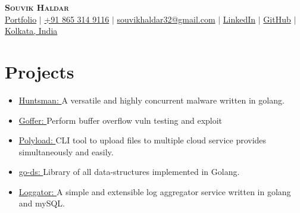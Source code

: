 \documentclass[letterpaper,11pt]{article}
\newcommand{\resumeItem}[1]{
  \item\small{
    {#1 \vspace{-2pt}}
  }
}
\newcommand{\resumeSubHeadingListStart}{\begin{itemize}[leftmargin=0.15in, label={}]}
\newcommand{\resumeSubHeadingListEnd}{\end{itemize}}
\newcommand{\resumeItemListStart}{\begin{itemize}}
\newcommand{\resumeItemListEnd}{\end{itemize}\vspace{-5pt}}
\begin{document}

\begin{center}
    \textbf{\Huge \scshape Souvik Haldar} \\ \vspace{3pt}
    \small
    \faGlobe \hspace{.5pt} \href{http://www.souvikhaldar.in}{Portfolio}
    $|$
    \faMobile \hspace{.5pt} \href{tel:918653149116}{+91 865 314 9116}
    $|$
    \faAt \hspace{.5pt} \href{mailto:souvikhaldar32@gmail.com}{souvikhaldar32@gmail.com}
    $|$
    \faLinkedinSquare \hspace{.5pt} \href{https://www.linkedin.com/in/souvikhaldar/}{LinkedIn}
    $|$
    \faGithub \hspace{.5pt} \href{https://github.com/souvikhaldar}{GitHub}
    $|$
    \faMapMarker \hspace{.5pt} \href{https://www.google.com/maps/place/Kolkata,+West+Bengal/@22.5354122,88.277313,12z/data=!3m1!4b1!4m5!3m4!1s0x39f882db4908f667:0x43e330e68f6c2cbc!8m2!3d22.572646!4d88.363895}{Kolkata, India}
\end{center}



\section{Projects}
    \vspace{3pt}
    \resumeSubHeadingListStart
      \small{\item{
	\resumeItemListStart
       		\resumeItem{\href{github.com/souvikhaldar/huntsman}{\color{blue}Huntsman: }{A versatile and highly concurrent malware written in golang.} \\ \vspace{3pt}} 
       		\resumeItem{\href{github.com/souvikhaldar/goffer}{\color{blue}Goffer: }{Perform buffer overflow vuln testing and exploit} \\ \vspace{3pt}} 
       		\resumeItem{\href{github.com/souvikhaldar/polyload}{\color{blue}Polyload: }{CLI tool to upload files to multiple cloud service provides simultaneously and easily.} \\ \vspace{3pt}} 
       		\resumeItem{\href{github.com/souvikhaldar/go-ds}{\color{blue}go-ds: }{Library of all data-structures implemented in Golang.} \\ \vspace{3pt}} 
       		\resumeItem{\href{https://github.com/souvikhaldar/loggator}{\color{blue}Loggator: }{A simple and extensible log aggregator service written in golang and mySQL.} \\ \vspace{3pt}} 
	\resumeItemListEnd
    }}
    \resumeSubHeadingListEnd
\end{document}
